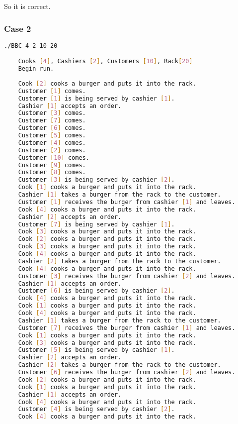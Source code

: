 So it is correct.

\subsubsection{Case 2}
\begin{lstlisting}[language=bash]
    ./BBC 4 2 10 20

    Cooks [4], Cashiers [2], Customers [10], Rack[20]
    Begin run.
    
    Cook [2] cooks a burger and puts it into the rack.
    Customer [1] comes.
    Customer [1] is being served by cashier [1].
    Cashier [1] accepts an order.
    Customer [3] comes.
    Customer [7] comes.
    Customer [6] comes.
    Customer [5] comes.
    Customer [4] comes.
    Customer [2] comes.
    Customer [10] comes.
    Customer [9] comes.
    Customer [8] comes.
    Customer [3] is being served by cashier [2].
    Cook [1] cooks a burger and puts it into the rack.
    Cashier [1] takes a burger from the rack to the customer.
    Customer [1] receives the burger from cashier [1] and leaves.
    Cook [4] cooks a burger and puts it into the rack.
    Cashier [2] accepts an order.
    Customer [7] is being served by cashier [1].
    Cook [3] cooks a burger and puts it into the rack.
    Cook [2] cooks a burger and puts it into the rack.
    Cook [3] cooks a burger and puts it into the rack.
    Cook [4] cooks a burger and puts it into the rack.
    Cashier [2] takes a burger from the rack to the customer.
    Cook [4] cooks a burger and puts it into the rack.
    Customer [3] receives the burger from cashier [2] and leaves.
    Cashier [1] accepts an order.
    Customer [6] is being served by cashier [2].
    Cook [4] cooks a burger and puts it into the rack.
    Cook [1] cooks a burger and puts it into the rack.
    Cook [4] cooks a burger and puts it into the rack.
    Cashier [1] takes a burger from the rack to the customer.
    Customer [7] receives the burger from cashier [1] and leaves.
    Cook [1] cooks a burger and puts it into the rack.
    Cook [3] cooks a burger and puts it into the rack.
    Customer [5] is being served by cashier [1].
    Cashier [2] accepts an order.
    Cashier [2] takes a burger from the rack to the customer.
    Customer [6] receives the burger from cashier [2] and leaves.
    Cook [2] cooks a burger and puts it into the rack.
    Cook [1] cooks a burger and puts it into the rack.
    Cashier [1] accepts an order.
    Cook [4] cooks a burger and puts it into the rack.
    Customer [4] is being served by cashier [2].
    Cook [4] cooks a burger and puts it into the rack.

\end{lstlisting}

